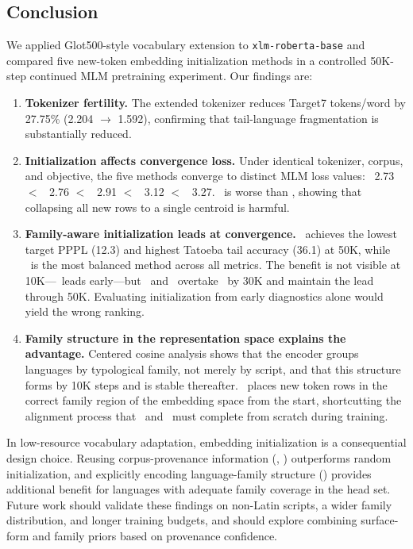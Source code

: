 \subsection{Conclusion}

We applied Glot500-style vocabulary extension to \texttt{xlm-roberta-base} and compared
five new-token embedding initialization methods in a controlled 50K-step continued MLM
pretraining experiment.
Our findings are:

\begin{enumerate}
  \item \textbf{Tokenizer fertility.} The extended tokenizer reduces Target7 tokens/word
        by 27.75\% (2.204 $\to$ 1.592), confirming that tail-language fragmentation is
        substantially reduced.

  \item \textbf{Initialization affects convergence loss.}
        Under identical tokenizer, corpus, and objective, the five methods converge to
        distinct MLM loss values: \wfvt\ 2.73 $<$ \fvt\ 2.76 $<$ \famm\ 2.91
        $<$ \rand\ 3.12 $<$ \meanm\ 3.27.
        \meanm\ is worse than \rand, showing that collapsing all new rows to a single
        centroid is harmful.

  \item \textbf{Family-aware initialization leads at convergence.}
        \famm\ achieves the lowest target PPPL (12.3) and highest Tatoeba tail accuracy (36.1)
        at 50K, while \wfvt\ is the most balanced method across all metrics.
        The benefit is not visible at 10K---\fvt\ leads early---but \wfvt\ and \famm\
        overtake \fvt\ by 30K and maintain the lead through 50K.
        Evaluating initialization from early diagnostics alone would yield the wrong ranking.

  \item \textbf{Family structure in the representation space explains the advantage.}
        Centered cosine analysis shows that the encoder groups languages by typological family,
        not merely by script, and that this structure forms by 10K steps and is stable
        thereafter.
        \famm\ places new token rows in the correct family region of the embedding space
        from the start, shortcutting the alignment process that \rand\ and \meanm\
        must complete from scratch during training.
\end{enumerate}

In low-resource vocabulary adaptation, embedding initialization is a consequential design
choice.
Reusing corpus-provenance information (\fvt, \wfvt) outperforms random initialization,
and explicitly encoding language-family structure (\famm) provides additional benefit
for languages with adequate family coverage in the head set.
Future work should validate these findings on non-Latin scripts, a wider family distribution,
and longer training budgets, and should explore combining surface-form and family priors
based on provenance confidence.
